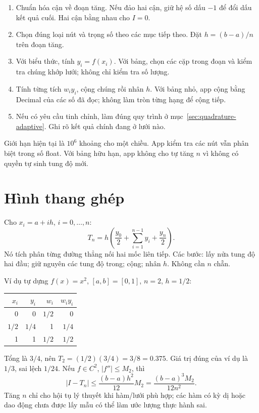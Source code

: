 \begin{enumerate}
\item Chuẩn hóa cận về đoạn tăng. Nếu đảo hai cận, giữ hệ số dấu $-1$ để đổi dấu kết quả cuối. Hai cận bằng nhau cho $I=0$.
\item Chọn đúng loại nút và trọng số theo các mục tiếp theo. Đặt $h=(b-a)/n$ trên đoạn tăng.
\item Với biểu thức, tính $y_i=f(x_i)$. Với bảng, chọn các cặp trong đoạn và kiểm tra chúng khớp lưới; không chỉ kiểm tra số lượng.
\item Tính từng tích $w_iy_i$, cộng chúng rồi nhân $h$. Với bảng nhỏ, app cộng bằng Decimal của các số đã đọc; không làm tròn từng hạng để cộng tiếp.
\item Nếu có yêu cầu tinh chỉnh, làm đúng quy trình ở mục~\ref{sec:quadrature-adaptive}. Ghi rõ kết quả chính đang ở lưới nào.
\end{enumerate}

Giới hạn hiện tại là $10^6$ khoảng cho một chiều. App kiểm tra các nút vẫn phân biệt trong số float. Với bảng hữu hạn, app không cho tự tăng $n$ vì không có quyền tự sinh tung độ mới.

\section{Hình thang ghép}
\label{sec:trapezoid}
Cho $x_i=a+ih$, $i=0,\ldots,n$:
\[
T_n=h\left(\frac{y_0}{2}+\sum_{i=1}^{n-1}y_i+\frac{y_n}{2}\right).
\]
Nó tích phân từng đường thẳng nối hai mốc liên tiếp. Các bước: lấy nửa tung độ hai đầu; giữ nguyên các tung độ trong; cộng; nhân $h$. Không cần $n$ chẵn.

Ví dụ tự dựng $f(x)=x^2$, $[a,b]=[0,1]$, $n=2$, $h=1/2$:
\begin{center}\begin{tabular}{rrrr}
\toprule $x_i$&$y_i$&$w_i$&$w_iy_i$\\\midrule
0&0&$1/2$&0\\
$1/2$&$1/4$&1&$1/4$\\
1&1&$1/2$&$1/2$\\\bottomrule
\end{tabular}\end{center}
Tổng là $3/4$, nên $T_2=(1/2)(3/4)=3/8=0.375$. Giá trị đúng của ví dụ là $1/3$, sai lệch $1/24$.
Nếu $f\in C^2$, $|f''|\le M_2$, thì
\[
|I-T_n|\le\frac{(b-a)h^2}{12}M_2=\frac{(b-a)^3M_2}{12n^2}.
\]
Tăng $n$ chỉ cho hội tụ lý thuyết khi hàm/lưới phù hợp; các hàm có kỳ dị hoặc dao động chưa được lấy mẫu có thể làm ước lượng thực hành sai.

